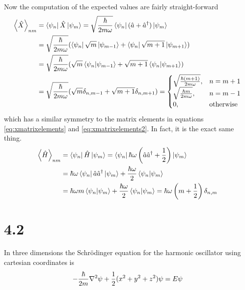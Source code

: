 \documentclass{article}
\begin{document}
Now the computation of the expected values are fairly straight-forward
\begin{align*}
\ev{\hat{X}}_{nm}&=\bra{\psi_n}\hat{X}\ket{\psi_m}=\sqrt{\frac{\hbar}{2m\omega}}\bra{\psi_n}(\hat{a}+\hat{a}^{\dagger})\ket{\psi_m} \\
&=\sqrt{\frac{\hbar}{2m\omega}}(\bra{\psi_n}\sqrt{m}\ket{\psi_{m-1}}+\bra{\psi_n}\sqrt{m+1}\ket{\psi_{m+1}}) \\
&= \sqrt{\frac{\hbar}{2m\omega}}(\sqrt{m}\bra{\psi_n}\ket{\psi_{m-1}}+\sqrt{m+1}\bra{\psi_n}\ket{\psi_{m+1}}) \\
&= \sqrt{\frac{\hbar}{2m\omega}}(\sqrt{m}\delta_{n,m-1}+\sqrt{m+1}\delta_{n,m+1}) 
= \begin{cases}
	\sqrt{\frac{\hbar (m+1)}{2m\omega}}, & n=m+1 \\
	\sqrt{\frac{\hbar m}{2m\omega}}, & n=m-1\\
	0, & \text{otherwise}
\end{cases}
\end{align*}
which has a similar symmetry to the matrix elements in equations \ref{eq:xmatrixelements} and \ref{eq:xmatrixelements2}. In fact, it is the exact same thing. 
\begin{align*}
\ev{\hat{H}}_{nm}&=\bra{\psi_n}\hat{H}\ket{\psi_m}=\bra{\psi_n}\hbar\omega\left(\hat{a}\hat{a}^{\dagger}+\frac{1}{2}\right)\ket{\psi_m} \\
&= \hbar\omega \bra{\psi_n}\hat{a}\hat{a}^{\dagger}\ket{\psi_m}+\frac{\hbar\omega}{2}\braket{\psi_n}{\psi_m}\\
&=\hbar\omega m\braket{\psi_n}{\psi_m}+\frac{\hbar\omega}{2}\braket{\psi_n}{\psi_m} = \hbar\omega\left(m+\frac{1}{2}\right) \delta_{n,m}
\end{align*}

\section*{4.2}

In three dimensions the Schrödinger equation for the harmonic oscillator using cartesian coordinates is
\begin{equation}
-\frac{\hbar}{2m}\laplacian \psi + \frac{1}{2}(x^2+y^2+z^2)\psi = E\psi
\end{equation}
\end{document}

